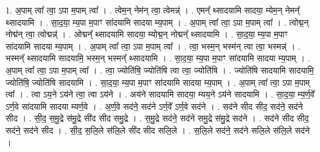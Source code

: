 \documentclass[17pt]{extarticle}
\begin{document}
1. अ॒पाम् त्वा᳚ त्वा॒ ऽपा म॒पाम् त्वा᳚ । . त्वेम॒न् नेम॑न् त्वा॒ त्वेमन्न्॑ । . एमन्᳚ थ्सादयामि सादया॒ म्येम॒न् नेमन्᳚ थ्सादयामि । . सा॒द॒या॒ म्य॒पा म॒पाꣳ सा॑दयामि सादया म्य॒पाम् । . अ॒पाम् त्वा᳚ त्वा॒ ऽपा म॒पाम् त्वा᳚ । . त्वोद्म॒न् नोद्म॑न् त्वा॒ त्वोद्मन्न्॑ । . ओद्मन्᳚ थ्सादयामि सादया॒ म्योद्म॒न् नोद्मन्᳚ थ्सादयामि । . सा॒द॒या॒ म्य॒पा म॒पाꣳ सा॑दयामि सादया म्य॒पाम् । . अ॒पाम् त्वा᳚ त्वा॒ ऽपा म॒पाम् त्वा᳚ । . त्वा॒ भस्म॒न् भस्म॑न् त्वा त्वा॒ भस्मन्न्॑ । . भस्मन्᳚ थ्सादयामि सादयामि॒ भस्म॒न् भस्मन्᳚ थ्सादयामि । . सा॒द॒या॒ म्य॒पा म॒पाꣳ सा॑दयामि सादया म्य॒पाम् । . अ॒पाम् त्वा᳚ त्वा॒ ऽपा म॒पाम् त्वा᳚ । . त्वा॒ ज्योति॑षि॒ ज्योति॑षि त्वा त्वा॒ ज्योति॑षि । . ज्योति॑षि सादयामि सादयामि॒ ज्योति॑षि॒ ज्योति॑षि सादयामि । . सा॒द॒या॒ म्य॒पा म॒पाꣳ सा॑दयामि सादया म्य॒पाम् । . अ॒पाम् त्वा᳚ त्वा॒ ऽपा म॒पाम् त्वा᳚ । . त्वा ऽय॒ने ऽय॑ने त्वा॒ त्वा ऽय॑ने । . अय॑ने सादयामि सादया॒ म्यय॒ने ऽय॑ने सादयामि । . सा॒द॒या॒ म्य॒र्ण॒वे᳚ ऽर्ण॒वे सा॑दयामि सादया म्यर्ण॒वे । . अ॒र्ण॒वे सद॑ने॒ सद॑ने ऽर्ण॒वे᳚ ऽर्ण॒वे सद॑ने । . सद॑ने सीद सीद॒ सद॑ने॒ सद॑ने सीद । . सी॒द॒ स॒मु॒द्रे स॑मु॒द्रे सी॑द सीद समु॒द्रे । . स॒मु॒द्रे सद॑ने॒ सद॑ने समु॒द्रे स॑मु॒द्रे सद॑ने । . सद॑ने सीद सीद॒ सद॑ने॒ सद॑ने सीद । . सी॒द॒ स॒लि॒ले स॑लि॒ले सी॑द सीद सलि॒ले । . स॒लि॒ले सद॑ने॒ सद॑ने सलि॒ले स॑लि॒ले सद॑ने । \newline
\end{document}
